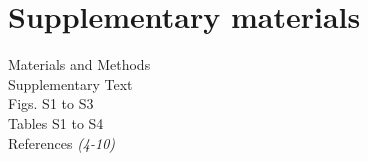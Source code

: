 \documentclass[12pt]{article}
\begin{document}
\section*{Supplementary materials}
Materials and Methods\\
Supplementary Text\\
Figs. S1 to S3\\
Tables S1 to S4\\
References \textit{(4-10)}
\end{document}
